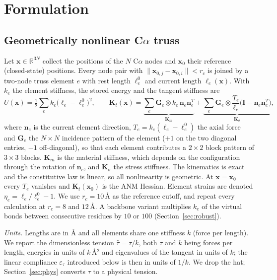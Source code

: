\documentclass[preprint,12pt,a4paper]{elsarticle}
\newcommand{\x}{\mathbf{x}}
\newcommand{\Kt}{\mathbf{K}_t}
\newcommand{\eps}{\varepsilon}
\begin{document}
\section{Formulation}
\label{sec:form}
\subsection{\texorpdfstring{Geometrically nonlinear C$\alpha$ truss}{Geometrically nonlinear C-alpha truss}}
Let $\x\in\mathbb{R}^{3N}$ collect the positions of the $N$ C$\alpha$ nodes and $\x_0$ their reference (closed-state) positions. Every node pair with $\|\x_{0,j}-\x_{0,i}\|<r_c$ is joined by a two-node truss element $e$ with rest length $\ell_e^0$ and current length $\ell_e(\x)$. With $k_e$ the element stiffness, the stored energy and the tangent stiffness are
\begin{equation}
U(\x)=\tfrac12\sum_e k_e\bigl(\ell_e-\ell_e^0\bigr)^2,\qquad
\Kt(\x)=\underbrace{\sum_e \mathbf{G}_e\otimes k_e\,\mathbf{n}_e\mathbf{n}_e^{T}}_{\mathbf{K}_m}
+\underbrace{\sum_e \mathbf{G}_e\otimes \frac{T_e}{\ell_e}\bigl(\mathbf{I}-\mathbf{n}_e\mathbf{n}_e^{T}\bigr)}_{\mathbf{K}_\sigma},
\label{eq:U}
\end{equation}
where $\mathbf{n}_e$ is the current element direction, $T_e=k_e(\ell_e-\ell_e^0)$ the axial force and $\mathbf{G}_e$ the $N\times N$ incidence pattern of the element ($+1$ on the two diagonal entries, $-1$ off-diagonal), so that each element contributes a $2\times2$ block pattern of $3\times3$ blocks. $\mathbf{K}_m$ is the material stiffness, which depends on the configuration through the rotation of $\mathbf{n}_e$, and $\mathbf{K}_\sigma$ the stress stiffness. The kinematics is exact and the constitutive law is linear, so all nonlinearity is geometric. At $\x=\x_0$ every $T_e$ vanishes and $\Kt(\x_0)$ is the ANM Hessian. Element strains are denoted $\eta_e=\ell_e/\ell_e^0-1$. We use $r_c=10$\,\AA{} as the reference cutoff, and repeat every calculation at $r_c=8$ and $12$\,\AA. A backbone variant multiplies $k_e$ of the virtual bonds between consecutive residues by $10$ or $100$ (Section~\ref{sec:robust}).

\emph{Units.} Lengths are in \AA{} and all elements share one stiffness $k$ (force per length). We report the dimensionless tension $\hat\tau=\tau/k$, both $\tau$ and $k$ being forces per length, energies in units of $k$\,\AA$^2$ and eigenvalues of the tangent in units of $k$; the linear compliance $\eps_\tau$ introduced below is then in units of $1/k$. We drop the hat; Section~\ref{sec:phys} converts $\tau$ to a physical tension.
\end{document}
